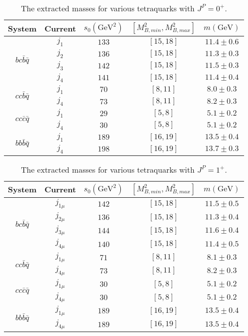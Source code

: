 \documentclass[prd,showpacs,showkeys,floatfix,amsmath,amssymb,floatfix,english]{revtex4}
\begin{document}
\begin{table}
\begin{centering}
\begin{tabular}{|c|c|c|c|c|}
\hline System & Current & $s_{0}\left(\mathrm{GeV}^{2}\right)$ &
$\left[M_{B,min}^{2},M_{B,max}^{2}\right]$ &
$m\left(\mathrm{GeV}\right)$\tabularnewline \hline
\multirow{4}{*}{$bc\bar{b}\bar{q}$} & $j_{1}$ & $133$ &
$\left[15,18\right]$ & $11.4\pm0.6$\tabularnewline \cline{2-5}
 & $j_{2}$ & $136$ & $\left[15,18\right]$ & $11.3\pm0.3$\tabularnewline
\cline{2-5}
 & $j_{3}$ & $142$ & $\left[15,18\right]$ & $11.5\pm0.3$\tabularnewline
\cline{2-5}
 & $j_{4}$ & $141$ & $\left[15,18\right]$ & $11.4\pm0.4$\tabularnewline
\hline \multirow{2}{*}{$cc\bar{b}\bar{q}$} & $j_{1}$ & $70$ &
$\left[8,11\right]$ & $8.0\pm0.3$\tabularnewline \cline{2-5}
 & $j_{4}$ & $73$ & $\left[8,11\right]$ & $8.2\pm0.3$\tabularnewline
\hline \multirow{2}{*}{$cc\bar{c}\bar{q}$} & $j_{1}$ & $29$ &
$\left[5,8\right]$ & $5.1\pm0.2$\tabularnewline \cline{2-5}
 & $j_{4}$ & $30$ & $\left[5,8\right]$ & $5.1\pm0.2$\tabularnewline
\hline \multirow{2}{*}{$bb\bar{b}\bar{q}$} & $j_{1}$ & $189$ &
$\left[16,19\right]$ & $13.5\pm0.4$\tabularnewline \cline{2-5}
 & $j_{4}$ & $198$ & $\left[16,19\right]$ & $13.7\pm0.3$\tabularnewline
\hline
\end{tabular}
\par\end{centering}
\caption{\label{tab:j0_masses}The extracted masses for various
tetraquarks with $J^{P}=0^{+}$. }
\end{table}

\begin{table}

\begin{centering}
\begin{tabular}{|c|c|c|c|c|}
\hline System & Current & $s_{0}\left(\mathrm{GeV}^{2}\right)$ &
$\left[M_{B,min}^{2},M_{B,max}^{2}\right]$ &
$m\left(\mathrm{GeV}\right)$\tabularnewline \hline
\multirow{4}{*}{$bc\bar{b}\bar{q}$} & $j_{1\mu}$ & $142$ &
$\left[15,18\right]$ & $11.5\pm0.5$\tabularnewline \cline{2-5}
 & $j_{2\mu}$ & $136$ & $\left[15,18\right]$ & $11.3\pm0.4$\tabularnewline
\cline{2-5}
 & $j_{3\mu}$ & $144$ & $\left[15,18\right]$ & $11.6\pm0.4$\tabularnewline
\cline{2-5}
 & $j_{4\mu}$ & $140$ & $\left[15,18\right]$ & $11.4\pm0.5$\tabularnewline
\hline \multirow{2}{*}{$cc\bar{b}\bar{q}$} & $j_{1\mu}$ & $71$ &
$\left[8,11\right]$ & $8.1\pm0.3$\tabularnewline \cline{2-5}
 & $j_{4\mu}$ & $73$ & $\left[8,11\right]$ & $8.2\pm0.3$\tabularnewline
\hline \multirow{2}{*}{$cc\bar{c}\bar{q}$} & $j_{1\mu}$ & $30$ &
$\left[5,8\right]$ & $5.1\pm0.2$\tabularnewline \cline{2-5}
 & $j_{4\mu}$ & $30$ & $\left[5,8\right]$ & $5.1\pm0.2$\tabularnewline
\hline \multirow{2}{*}{$bb\bar{b}\bar{q}$} & $j_{1\mu}$ & $189$ &
$\left[16,19\right]$ & $13.5\pm0.4$\tabularnewline \cline{2-5}
 & $j_{4\mu}$ & $189$ & $\left[16,19\right]$ & $13.5\pm0.4$\tabularnewline
\hline
\end{tabular}
\par\end{centering}
\caption{\label{tab:j1_masses}The extracted masses for various
tetraquarks with $J^{P}=1^{+}$.}

\end{table}
\end{document}
